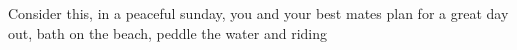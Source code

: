 Consider this, in a peaceful sunday, you and your best mates plan for a great day out, bath on the beach, peddle the water and riding 